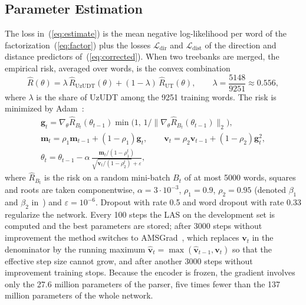 \documentclass[mathematics,article,submit,pdftex,oneauthor]{Definitions/mdpi}
\begin{document}
\subsection{Parameter Estimation}\label{sec:estimation}
The loss in~(\ref{eq:estimate}) is the mean negative log-likelihood per word of the factorization~(\ref{eq:factor}) plus the losses $\mathcal L_{\mathrm{dir}}$ and $\mathcal L_{\mathrm{dist}}$ of the direction and distance predictors of~(\ref{eq:corrected}).
When two treebanks are merged, the empirical risk, averaged over words, is the convex combination
\begin{equation}\label{eq:mixture}
\widehat R(\theta)=\lambda\,\widehat R_{\mathrm{UzUDT}}(\theta)+(1-\lambda)\,\widehat R_{\mathrm{UT}}(\theta),\qquad \lambda=\frac{5148}{9251}\approx0.556,
\end{equation}
where $\lambda$ is the share of UzUDT among the 9251 training words.
The risk is minimized by Adam~\cite{Kingma2015}:
\begin{equation}\label{eq:adam}
\begin{gathered}
\mathbf g_t=\nabla_\theta\widehat R_{B_t}(\theta_{t-1})\min\bigl(1,\,1/\|\nabla_\theta\widehat R_{B_t}(\theta_{t-1})\|_2\bigr),\\
\mathbf m_t=\rho_1\mathbf m_{t-1}+(1-\rho_1)\mathbf g_t,\qquad
\mathbf v_t=\rho_2\mathbf v_{t-1}+(1-\rho_2)\mathbf g_t^{2},\\
\theta_t=\theta_{t-1}-\alpha\,\frac{\mathbf m_t/(1-\rho_1^{t})}{\sqrt{\mathbf v_t/(1-\rho_2^{t})}+\varepsilon},
\end{gathered}
\end{equation}
where $\widehat R_{B_t}$ is the risk on a random mini-batch $B_t$ of at most 5000 words, squares and roots are taken componentwise, $\alpha=3\cdot10^{-3}$, $\rho_1=0.9$, $\rho_2=0.95$ (denoted $\beta_1$ and $\beta_2$ in~\cite{Kingma2015}) and $\varepsilon=10^{-6}$.
Dropout with rate 0.5 and word dropout with rate 0.33 regularize the network.
Every 100 steps the LAS on the development set is computed and the best parameters are stored; after 3000 steps without improvement the method switches to AMSGrad~\cite{Reddi2018}, which replaces $\mathbf v_t$ in the denominator by the running maximum $\hat{\mathbf v}_t=\max(\hat{\mathbf v}_{t-1},\mathbf v_t)$ so that the effective step size cannot grow, and after another 3000 steps without improvement training stops.
Because the encoder is frozen, the gradient involves only the 27.6 million parameters of the parser, five times fewer than the 137 million parameters of the whole network.
\end{document}
